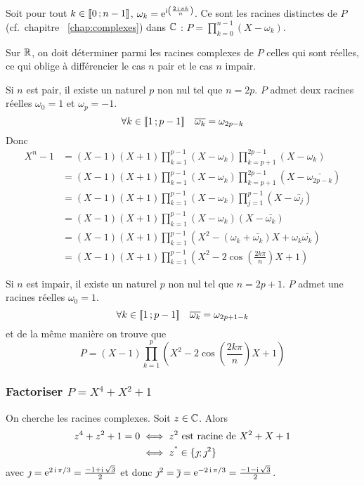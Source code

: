   Soit pour tout \(k \in \mathopen{\llbracket}0\mathclose{}\mathpunct{};n-1\mathclose{\rrbracket}\), \(\omega_k = \operatorname{e}^{\operatorname{i}\left(\frac{2\operatorname{i} \pi k}{n}\right)}\). Ce sont les racines distinctes de \(P\) (cf.\ chapitre~
  \ref{chap:complexes}) dans \(\mathbb{C}\) : \(P = \prod_{k=0}^{n-1}(X-\omega_k)\).

  Sur \(\mathbb{R}\), on doit déterminer parmi les racines complexes de \(P\) celles qui sont réelles, ce qui oblige à différencier le cas \(n\) pair et le cas \(n\) impair.

  Si \(n\) est pair, il existe un naturel \(p\) non nul tel que \(n=2p\). \(P\) admet deux racines réelles \(\omega_0=1\) et \(\omega_p=-1\).
  \begin{equation}
    \forall k \in \mathopen{\llbracket}1\mathclose{}\mathpunct{};p-1\mathclose{\rrbracket} \quad \overline{\omega_k}=\omega_{2p-k}
  \end{equation}
  Donc
  \begin{align}
    X^n-1 &= (X-1)(X+1) \prod_{k=1}^{p-1} (X-\omega_k)\prod_{k=p+1}^{2p-1} (X-\omega_k) \\
          &=(X-1)(X+1) \prod_{k=1}^{p-1} (X-\omega_k) \prod_{k=p+1}^{2p-1} (X-\bar{\omega_{2p-k}})\\
          &=(X-1)(X+1) \prod_{k=1}^{p-1} (X-\omega_k) \prod_{j=1}^{p-1} (X-\bar{\omega_{j}})\\
          &=(X-1)(X+1) \prod_{k=1}^{p-1} (X-\omega_k)(X-\bar{\omega_{k}})\\
          &=(X-1)(X+1) \prod_{k=1}^{p-1} (X^2-(\omega_k+\bar{\omega_k})X+\omega_k\bar{\omega_k})\\
          &=(X-1)(X+1) \prod_{k=1}^{p-1} \left(X^2-2\cos\left(\frac{2k\pi}{n}\right)X+1\right)
  \end{align}

  Si \(n\) est impair, il existe un naturel \(p\) non nul tel que \(n=2p+1\). \(P\) admet une racines réelles \(\omega_0=1\).
  \begin{equation}
    \forall k \in \mathopen{\llbracket}1\mathclose{}\mathpunct{};p-1\mathclose{\rrbracket} \quad \overline{\omega_k}=\omega_{2p+1-k}
  \end{equation}
  et de la même manière on trouve que
  \begin{equation}
    P=(X-1) \prod_{k=1}^{p} \left(X^2-2\cos\left(\frac{2k\pi}{n}\right)X+1\right)
  \end{equation}

  \subsubsection{Factoriser \(P=X^4+X^2+1\)}

  On cherche les racines complexes. Soit \(z \in \mathbb{C}\). Alors
  \begin{align}
    z^4+z^2+1=0 &\iff z^2 \text{~est racine de~} X^2+X+1 \\
                &\iff z^" \in \{\jmath ; \jmath^2\}
  \end{align}
  avec \(\jmath=\operatorname{e}^{2\operatorname{i}\pi/3} = \frac{-1+\operatorname{i}\sqrt{3}}{2}\) et donc \(\jmath^2=\overline{\jmath} = \operatorname{e}^{-2\operatorname{i}\pi/3} = \frac{-1-\operatorname{i}\sqrt{3}}{2}\). 

